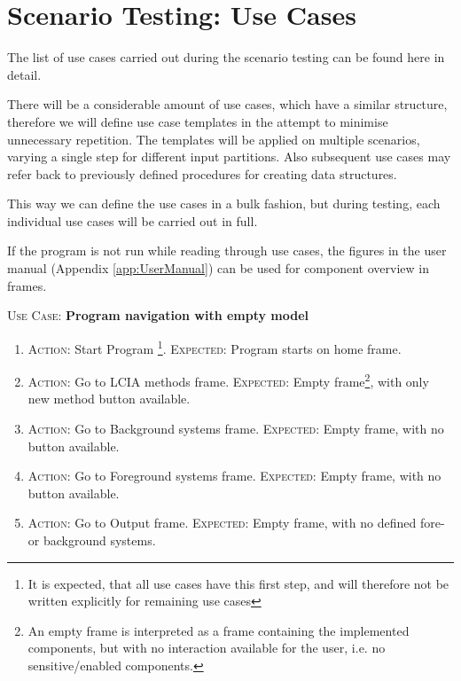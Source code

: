\section{Scenario Testing: Use Cases} \label{app:Appendix-UseCases}
The list of use cases carried out during the scenario testing can be found here in detail.

There will be a considerable amount of use cases, which have a similar structure, therefore we will define use case templates in the attempt to minimise unnecessary repetition. The templates will be applied on multiple scenarios, varying a single step for different input partitions. Also subsequent use cases may refer back to previously defined procedures for creating data structures.

This way we can define the use cases in a bulk fashion, but during testing, each individual use cases will be carried out in full. 

If the program is not run while reading through use cases, the figures in the user manual (Appendix \ref{app:UserManual}) can be used for component overview in frames.




\newcommand{\usecase}[2]
{
\vspace{5mm}
\textsc{Use Case:} \textbf{#1}
\vspace{1mm}
\begin{enumerate}#2\end{enumerate}
}

\newcommand{\step}[2]
{
\item \textsc{Action:} #1. \newline
\textsc{Expected:} #2.
}

\newcommand{\placeholder}
{
\item \textless\textsc{placeholder}\textgreater
}

\newcommand{\placeholders}[1]
{
List of applied placeholders:
\begin{itemize}#1\end{itemize}
}




\usecase{Program navigation with empty model}
{
\step
{Start Program \footnote{It is expected, that all use cases have this first step, and will therefore not be written explicitly for remaining use cases}}
{Program starts on home frame}

\step
{Go to LCIA methods frame}
{Empty frame\footnote{An empty frame is interpreted as a frame containing the implemented components, but with no interaction available for the user, i.e. no sensitive/enabled components.}, with only new method button available}

\step
{Go to Background systems frame}
{Empty frame, with no button available}

\step
{Go to Foreground systems frame}
{Empty frame, with no button available}

\step
{Go to Output frame}
{Empty frame, with no defined fore- or background systems}
}


